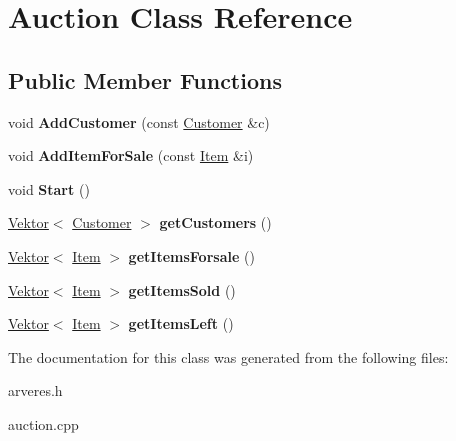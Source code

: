\hypertarget{class_auction}{}\section{Auction Class Reference}
\label{class_auction}
\subsection*{Public Member Functions}
\begin{DoxyCompactItemize}
\item 
\mbox{\label{class_auction_aec096a09ce01dc5da5d33f75867c93c1}} 
void {\bfseries Add\+Customer} (const \mbox{\hyperlink{class_customer}{Customer}} \&c)
\item 
\mbox{\label{class_auction_a1a680a4625b382937fdb0e2fceb15dc6}} 
void {\bfseries Add\+Item\+For\+Sale} (const \mbox{\hyperlink{class_item}{Item}} \&i)
\item 
\mbox{\label{class_auction_a5c55ff2cf2f346fe425f2ab057088bb6}} 
void {\bfseries Start} ()
\item 
\mbox{\label{class_auction_a73802f99e05116fa42aac3bad4c65d61}} 
\mbox{\hyperlink{class_vektor}{Vektor}}$<$ \mbox{\hyperlink{class_customer}{Customer}} $>$ {\bfseries get\+Customers} ()
\item 
\mbox{\label{class_auction_aefdfcf3012d9b5e70ac5c8b741643f62}} 
\mbox{\hyperlink{class_vektor}{Vektor}}$<$ \mbox{\hyperlink{class_item}{Item}} $>$ {\bfseries get\+Items\+Forsale} ()
\item 
\mbox{\label{class_auction_a806a59dfb008c0fb7da5c7ed0d719e37}} 
\mbox{\hyperlink{class_vektor}{Vektor}}$<$ \mbox{\hyperlink{class_item}{Item}} $>$ {\bfseries get\+Items\+Sold} ()
\item 
\mbox{\label{class_auction_a3b5ff26df31e10c41e558b6baf41c9f5}} 
\mbox{\hyperlink{class_vektor}{Vektor}}$<$ \mbox{\hyperlink{class_item}{Item}} $>$ {\bfseries get\+Items\+Left} ()
\end{DoxyCompactItemize}


The documentation for this class was generated from the following files\+:\begin{DoxyCompactItemize}
\item 
arveres.\+h\item 
auction.\+cpp\end{DoxyCompactItemize}
